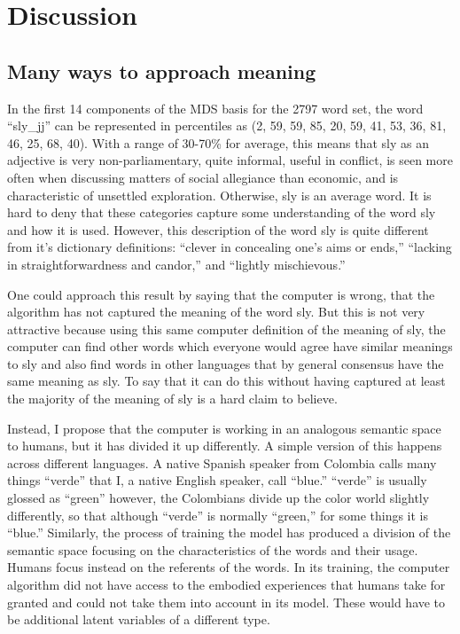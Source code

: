 \chapter{Discussion}

\section{Many ways to approach meaning}

In the first 14 components of the MDS basis for the 2797 word set, the word
``sly\_jj'' can be represented in percentiles as (2, 59, 59, 85, 20, 59, 41, 
53, 36, 81, 46, 25, 68, 40). With a range of 30-70\% for average, this means 
that sly as an adjective is very non-parliamentary, quite informal, useful in 
conflict, is seen more often when discussing matters of social allegiance than
economic, and is characteristic of unsettled exploration. Otherwise, sly is an
average word. It is hard to deny that these categories capture some 
understanding of the word sly and how it is used. However, this description of
the word sly is quite different from it's dictionary definitions: 
``clever in concealing one's aims or ends,'' ``lacking in straightforwardness 
and candor,'' and ``lightly mischievous.'' \citep{SlyMerriamWebster2014}

One could approach this result by saying that the computer is wrong, that the
algorithm has not captured the meaning of the word sly. But this is not very
attractive because using this same computer definition of the meaning of sly,
the computer can find other words which everyone would agree have similar 
meanings to sly and also find words in other languages that by general 
consensus have the same meaning as sly. To say that it can do this without
having captured at least the majority of the meaning of sly is a hard claim
to believe. 

Instead, I propose that the computer is working in an analogous semantic space
to humans, but it has divided it up differently. A simple version of this 
happens across different languages. A native Spanish speaker from Colombia calls 
many things
``verde'' that I, a native English speaker, call ``blue.'' ``verde'' is usually
glossed as ``green'' however, the Colombians divide up the color world slightly
differently, so that although ``verde'' is normally ``green,'' for some things
it is ``blue.'' Similarly, the process of training the \modelname{} model has
produced a division of the semantic space focusing on the characteristics of 
the words and their usage. Humans focus instead on the referents of the words.
In its training, the computer algorithm did not have access to the embodied
experiences that humans take for granted and could not take them into account
in its model. These would have to be additional latent variables of a different
type.

